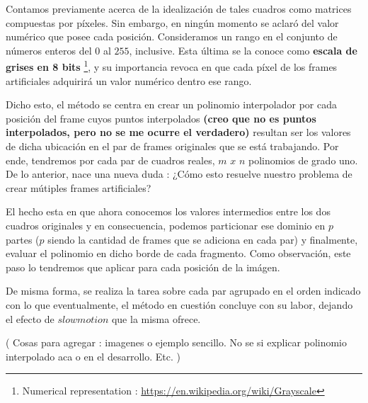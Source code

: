 Contamos previamente acerca de la idealizaci\'on de tales cuadros como matrices compuestas por p\'ixeles. Sin embargo, en ning\'un momento se aclar\'o del valor num\'erico que posee cada posici\'on. Consideramos un rango en el conjunto de n\'umeros enteros del $0$ al $255$, inclusive. Esta \'ultima se la conoce como \textbf{escala de grises en 8 bits} \footnote{Numerical representation : \url{https://en.wikipedia.org/wiki/Grayscale}}, y su importancia revoca en que cada p\'ixel de los frames artificiales adquirir\'a un valor num\'erico dentro ese rango.

Dicho esto, el m\'etodo se centra en crear un polinomio interpolador por cada posici\'on del frame cuyos puntos interpolados \textbf{(creo que no es puntos interpolados, pero no se me ocurre el verdadero)} resultan ser los valores de dicha ubicaci\'on en el par de frames originales que se est\'a trabajando. Por ende, tendremos por cada par de cuadros reales, $m$ $x$ $n$ polinomios de grado uno. De lo anterior, nace una nueva duda : ¿C\'omo esto resuelve nuestro problema de crear m\'utiples frames artificiales?

El hecho esta en que ahora conocemos los valores intermedios entre los dos cuadros originales y en consecuencia, podemos particionar ese dominio en $p$ partes ($p$ siendo la cantidad de frames que se adiciona en cada par) y finalmente, evaluar el polinomio en dicho borde de cada fragmento. Como observaci\'on, este paso lo tendremos que aplicar para cada posici\'on de la im\'agen.

De misma forma, se realiza la tarea sobre cada par agrupado en el orden indicado con lo que eventualmente, el m\'etodo en cuesti\'on concluye con su labor, dejando el efecto de $slowmotion$ que la misma ofrece.

( Cosas para agregar : imagenes o ejemplo sencillo. No se si explicar polinomio interpolado aca o en el desarrollo. Etc. ) 